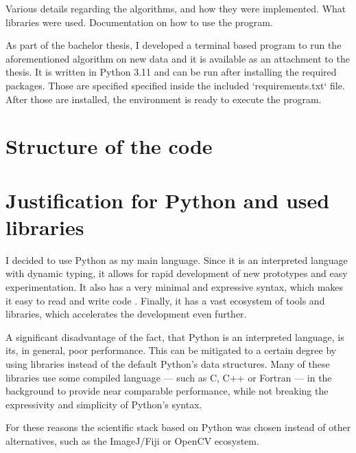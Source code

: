 \documentclass[
  digital,     %
  oneside,     %
  nosansbold,  %
  nocolorbold, %
  lof,         %
  lot,         %
]{fithesis4}
\begin{document}
Various details regarding the algorithms, and how they were implemented. What
libraries were used. Documentation on how to use the program.

As part of the bachelor thesis, I developed a terminal based program to run the
aforementioned algorithm on new data and it is available as an attachment to the
thesis. It is written in Python 3.11 and can be run after installing the
required packages. Those are specified specified inside the included
`requirements.txt` file. After those are installed, the environment is ready to
execute the program.


\section{Structure of the code}

\section{Justification for Python and used libraries}
I decided to use Python as my main language. Since it is an interpreted language
with dynamic typing, it allows for rapid development of new prototypes and easy
experimentation. It also has a very minimal and expressive syntax, which makes
it easy to read and write code \cite{python-docs-tutorial}. Finally, it has a
vast ecosystem of tools and libraries, which accelerates the development even
further. 

A significant disadvantage of the fact, that Python is an interpreted language,
is its, in general, poor performance. This can be mitigated to a certain degree
by using libraries instead of the default Python's data structures. Many of
these libraries use some compiled language --- such as C, C++ or Fortran --- in
the background to provide near comparable performance, while not breaking
the expressivity and simplicity of Python's syntax.

For these reasons the scientific stack based on Python was chosen instead of
other alternatives, such as the ImageJ/Fiji or OpenCV ecosystem.
\end{document}

